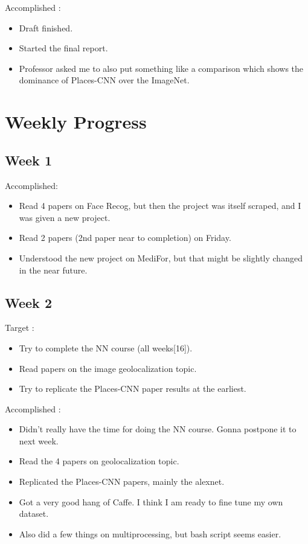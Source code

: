 \documentclass{article}
\begin{document}
Accomplished :
\begin{itemize}
\item Draft finished.
\item Started the final report.
\item Professor asked me to also put something like a comparison which shows the dominance of Places-CNN over the ImageNet.
\end{itemize}
\section{Weekly Progress}
\subsection{Week 1}
Accomplished:
\begin{itemize}
\item Read 4 papers on Face Recog, but then the project was itself scraped, and I was given a new project.
\item Read 2 papers (2nd paper near to completion) on Friday.
\item Understood the new project on MediFor, but that might be slightly changed in the near future.
\end{itemize}


\subsection{Week 2}
Target :
\begin{itemize}
\item Try to complete the NN course (all weeks[16]).
\item Read papers on the image geolocalization topic.
\item Try to replicate the Places-CNN paper results at the earliest.
\end{itemize}

Accomplished :
\begin{itemize}
\item Didn't really have the time for doing the NN course. Gonna postpone it to next week.
\item Read the 4 papers on geolocalization topic.
\item Replicated the Places-CNN papers, mainly the alexnet.
\item Got a very good hang of Caffe. I think I am ready to fine tune my own dataset.
\item Also did a few things on multiprocessing, but bash script seems easier.
\end{itemize}
\end{document}
